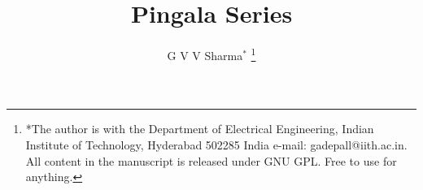 \documentclass[journal,12pt,twocolumn]{IEEEtran}
\begin{document}
\let\StandardTheFigure\thefigure
\renewcommand{\thefigure}{\theproblem}
\def\putbox#1#2#3{\makebox[0in][l]{\makebox[#1][l]{}\raisebox{\baselineskip}[0in][0in]{\raisebox{#2}[0in][0in]{#3}}}}
     \def\rightbox#1{\makebox[0in][r]{#1}}
     \def\centbox#1{\makebox[0in]{#1}}
     \def\topbox#1{\raisebox{-\baselineskip}[0in][0in]{#1}}
     \def\midbox#1{\raisebox{-0.5\baselineskip}[0in][0in]{#1}}
\vspace{3cm}

\title{ 
Pingala Series
}
%
%
%
\author{ G V V Sharma$^{*}$ %
\thanks{*The author is with the Department
of Electrical Engineering, Indian Institute of Technology, Hyderabad
502285 India e-mail:  gadepall@iith.ac.in.  All content in the manuscript is 
released under GNU GPL.  Free to use for anything. }%
}
% 
%
\end{document}
